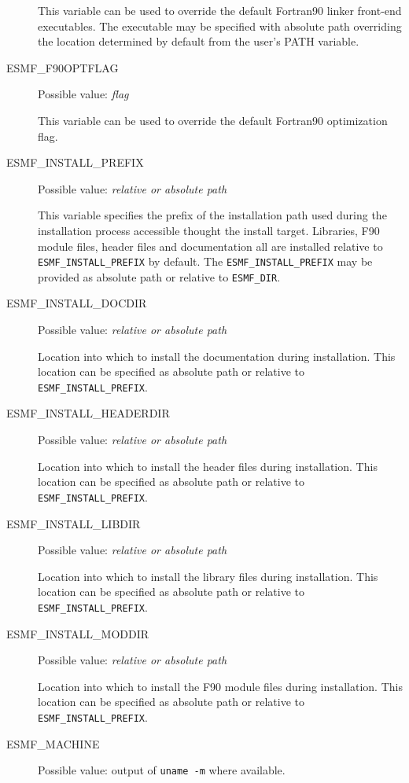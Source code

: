 \begin{description}
This variable can be used to override the default Fortran90 linker
front-end executables. The executable may be specified with absolute path
overriding the location determined by default from the user's PATH variable.

\item[ESMF\_F90OPTFLAG]
Possible value: {\em flag}

This variable can be used to override the default  Fortran90 optimization flag.

\item[ESMF\_INSTALL\_PREFIX]
Possible value: {\em relative or absolute path}

This variable specifies the prefix of the installation path used during the
installation process accessible thought the install target. Libraries, F90
module files, header files and documentation all are installed relative to
{\tt ESMF\_INSTALL\_PREFIX} by default. The {\tt ESMF\_INSTALL\_PREFIX} may be
provided as absolute path or relative to {\tt ESMF\_DIR}.

\item[ESMF\_INSTALL\_DOCDIR]
Possible value: {\em relative or absolute path}

Location into which to install the documentation during installation. This
location can be specified as absolute path or relative to
{\tt ESMF\_INSTALL\_PREFIX}.

\item[ESMF\_INSTALL\_HEADERDIR]
Possible value: {\em relative or absolute path}

Location into which to install the header files during installation. This
location can be specified as absolute path or relative to
{\tt ESMF\_INSTALL\_PREFIX}.

\item[ESMF\_INSTALL\_LIBDIR]
Possible value: {\em relative or absolute path}

Location into which to install the library files during installation. This
location can be specified as absolute path or relative to
{\tt ESMF\_INSTALL\_PREFIX}.

\item[ESMF\_INSTALL\_MODDIR]
Possible value: {\em relative or absolute path}

Location into which to install the F90 module files during installation. This
location can be specified as absolute path or relative to
{\tt ESMF\_INSTALL\_PREFIX}.

\item[ESMF\_MACHINE]
Possible value: output of {\tt uname -m} where available.


\end{description}
